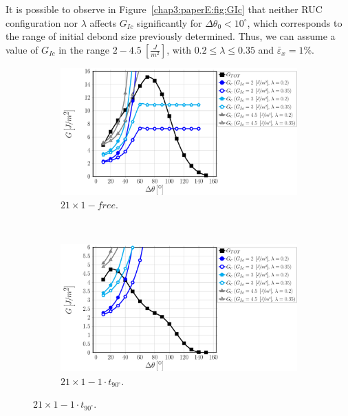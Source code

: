 It is possible to observe in Figure~\ref{chap3:paperE:fig:GIc} that neither RUC configuration nor $\lambda$ affects $G_{Ic}$ significantly for $\Delta\theta_{0}<10^{\circ}$, which corresponds to the range of initial debond size previously determined. Thus, we can assume a value of $G_{Ic}$ in the range $2-4.5\ \left[\frac{J}{m^{2}}\right]$, with $0.2\leq\lambda\leq0.35$ and $\bar{\varepsilon}_{x}=1\%$.

\begin{figure}[!htbp]
\centering
    \begin{subfigure}[b]{0.45\textwidth}
        \includegraphics[width=\textwidth]{paperE/vf60-dsize-S10A0.pdf}
        \caption{$21\times 1-free$.}\label{chap3:paperE:fig:debondsize-a}
    \end{subfigure} ~
    \begin{subfigure}[b]{0.45\textwidth}
        \includegraphics[width=\textwidth]{paperE/vf60-dsize-S10A0T1.pdf}
        \caption{$21\times 1-1\cdot t_{90^{\circ}}$.}\label{chap3:paperE:fig:debondsize-b}
    \end{subfigure}


\end{figure}
